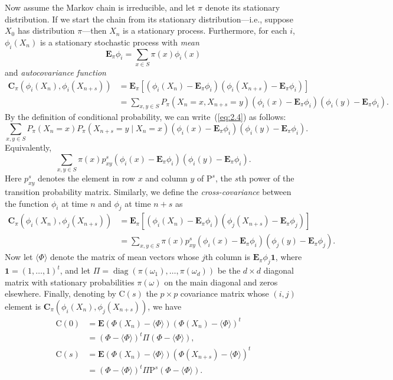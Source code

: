 \documentclass[12pt,letterpaper]{report}
\theoremstyle{plain}
\theoremstyle{definition}
\theoremstyle{remark}
\numberwithin{theorem}{chapter}
\numberwithin{claim}{chapter}
\numberwithin{equation}{chapter}
\numberwithin{conjecture}{chapter}
\newcommand\bC{\ensuremath{\mathbf{C}}}
\newcommand\C{\ensuremath{\mathrm{C}}}
\renewcommand\P{\ensuremath{\mathrm{P}}}
\newcommand\bE{\ensuremath{\mathbf{E}}}
\newcommand\<{\ensuremath{\langle}}
\renewcommand\>{\ensuremath{\rangle}}
\newcommand\diag{\ensuremath{\operatorname{diag}}}
\newcommand\one{\ensuremath{\mathbf{1}}}
\begin{document}
Now assume the Markov chain is irreducible, and let $\pi$ denote its stationary distribution.
If we start the chain from its stationary distribution---i.e., suppose $X_0$ has
distribution $\pi$---then $X_n$ is a stationary process. 
Furthermore, for each $i$, $\phi_i(X_n)$ is a stationary stochastic process with
\emph{mean}
\[
\bE_\pi\phi_i = \sum_{x\in S} \pi(x)\phi_i(x)
\]
and \emph{autocovariance function}
\begin{align}
\bC_\pi (\phi_i(X_n),  \phi_i (X_{n+s})) 
&= \bE_\pi[(\phi_i(X_n) - \bE_\pi\phi_i)(\phi_i(X_{n+s}) - \bE_\pi\phi_i)]\\
&= \sum_{x, y\in S} P_\pi(X_n = x, X_{n+s} = y) (\phi_i(x)- \bE_\pi\phi_i)(\phi_i(y) - \bE_\pi\phi_i).\nonumber
\end{align}
By the definition of conditional probability, we can write~(\ref{eq:2.4}) as follows:
\[
\sum_{x, y\in S} P_\pi(X_n = x) P_\pi(X_{n+s} = y\mid X_n = x) (\phi_i(x)-
\bE_\pi\phi_i)(\phi_i(y) - \bE_\pi\phi_i).
\]
Equivalently,
\[
\sum_{x, y\in S} \pi(x)p^s_{xy} (\phi_i(x)-\bE_\pi\phi_i)(\phi_i(y) - \bE_\pi\phi_i).
\]
Here $p^s_{xy}$ denotes the element in row $x$ and column $y$ of $\P^s$, the
$s$th power of the transition probability matrix. 
Similarly, we define the \emph{cross-covariance} between the function 
$\phi_i$ at time $n$ and $\phi_j$ at time $n+s$ as
\begin{align}
\bC_\pi (\phi_i(X_n),  \phi_j (X_{n+s})) 
&= \bE_\pi[(\phi_i(X_n) - \bE_\pi\phi_i)(\phi_j(X_{n+s}) - \bE_\pi\phi_j)]\nonumber\\
&= \sum_{x, y\in S} \pi(x)p^s_{xy} (\phi_i(x)-\bE_\pi\phi_i)(\phi_j(y) - \bE_\pi\phi_j).
\end{align}
Now let $\<\Phi\>$ denote the matrix of mean vectors whose $j$th column is 
$\bE_\pi\phi_j\one$, where $\one = (1,\dots, 1)^t$,
and let $\Pi = \diag(\pi(\omega_1),\dots, \pi(\omega_d))$ be the $d \times d$
diagonal matrix with stationary probabilities $\pi(\omega)$
on the main diagonal and zeros elsewhere. 
Finally, denoting by $\C(s)$ the $p \times p$ covariance matrix
whose $(i,j)$ element is $\bC_\pi(\phi_i(X_n), \phi_j(X_{n+s}))$, we have
\begin{align*}
\C(0) &= \bE(\Phi(X_n) - \<\Phi\>)(\Phi(X_n) - \<\Phi\>)^t\\
&= (\Phi - \<\Phi\>)^t\Pi (\Phi-\<\Phi\>), \\
\C(s) &= \bE(\Phi(X_n) - \<\Phi\>)(\Phi(X_{n+s}) - \<\Phi\>)^t\\
&= (\Phi - \<\Phi\>)^t \Pi \P^s (\Phi - \<\Phi\>).
\end{align*}
\end{document}
